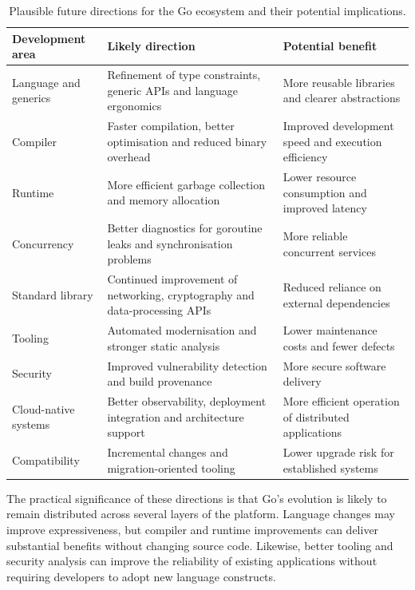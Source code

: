 \begin{table}[htbp]
\centering
\small
\begin{tabular}{|p{3.0cm}|p{5.0cm}|p{4.0cm}|}
\hline
\textbf{Development area} & \textbf{Likely direction} & \textbf{Potential benefit} \\
\hline
Language and generics & Refinement of type constraints, generic APIs and language ergonomics & More reusable libraries and clearer abstractions \\
\hline
Compiler & Faster compilation, better optimisation and reduced binary overhead & Improved development speed and execution efficiency \\
\hline
Runtime & More efficient garbage collection and memory allocation & Lower resource consumption and improved latency \\
\hline
Concurrency & Better diagnostics for goroutine leaks and synchronisation problems & More reliable concurrent services \\
\hline
Standard library & Continued improvement of networking, cryptography and data-processing APIs & Reduced reliance on external dependencies \\
\hline
Tooling & Automated modernisation and stronger static analysis & Lower maintenance costs and fewer defects \\
\hline
Security & Improved vulnerability detection and build provenance & More secure software delivery \\
\hline
Cloud-native systems & Better observability, deployment integration and architecture support & More efficient operation of distributed applications \\
\hline
Compatibility & Incremental changes and migration-oriented tooling & Lower upgrade risk for established systems \\
\hline
\end{tabular}
\caption{Plausible future directions for the Go ecosystem and their potential implications.}
\label{tab:go-future}
\end{table}

The practical significance of these directions is that Go's evolution is likely to remain distributed across several layers of the platform. Language changes may improve expressiveness, but compiler and runtime improvements can deliver substantial benefits without changing source code. Likewise, better tooling and security analysis can improve the reliability of existing applications without requiring developers to adopt new language constructs.

